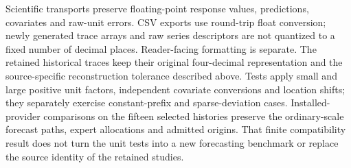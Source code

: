 Scientific transports preserve floating-point response values, predictions, covariates and raw-unit errors. CSV exports use round-trip float conversion; newly generated trace arrays and raw series descriptors are not quantized to a fixed number of decimal places. Reader-facing formatting is separate. The retained historical traces keep their original four-decimal representation and the source-specific reconstruction tolerance described above. Tests apply small and large positive unit factors, independent covariate conversions and location shifts; they separately exercise constant-prefix and sparse-deviation cases. Installed-provider comparisons on the fifteen selected histories preserve the ordinary-scale forecast paths, expert allocations and admitted origins. That finite compatibility result does not turn the unit tests into a new forecasting benchmark or replace the source identity of the retained studies.

